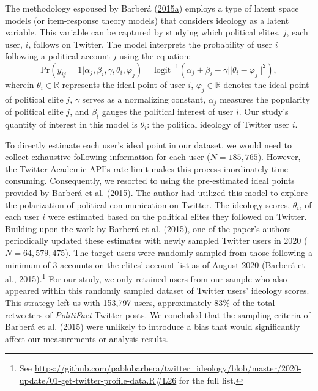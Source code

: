\documentclass[
  12pt,
]{article}
\begin{document}
The methodology espoused by Barberá
(\protect\hyperlink{ref-barbera2015birds}{2015a}) employs a type of
latent space models (or item-response theory models) that considers
ideology as a latent variable. This variable can be captured by studying
which political elites, \(j\), each user, \(i\), follows on Twitter. The
model interprets the probability of user \(i\) following a political
account \(j\) using the equation: \begin{equation}
\text{Pr}(y_{ij} = 1 |\alpha_j, \beta_i, \gamma, \theta_i, \varphi_j) = \text{logit}^{-1}\left(\alpha_j + \beta_i - \gamma||\theta_i - \varphi_j||^2\right),
\end{equation} wherein \(\theta_i \in \mathbb{R}\) represents the ideal
point of user \(i\), \(\varphi_j \in \mathbb{R}\) denotes the ideal
point of political elite \(j\), \(\gamma\) serves as a normalizing
constant, \(\alpha_j\) measures the popularity of political elite \(j\),
and \(\beta_i\) gauges the political interest of user \(i\). Our study's
quantity of interest in this model is \(\theta_i\): the political
ideology of Twitter user \(i\).

To directly estimate each user's ideal point in our dataset, we would
need to collect exhaustive following information for each user
(\(N = 185,765\)). However, the Twitter Academic API's rate limit makes
this process inordinately time-consuming. Consequently, we resorted to
using the pre-estimated ideal points provided by Barberá et al.
(\protect\hyperlink{ref-barbera2015tweeting}{2015}). The author had
utilized this model to explore the polarization of political
communication on Twitter. The ideology scores, \(\theta_i\), of each
user \(i\) were estimated based on the political elites they followed on
Twitter. Building upon the work by Barberá et al.
(\protect\hyperlink{ref-barbera2015tweeting}{2015}), one of the paper's
authors periodically updated these estimates with newly sampled Twitter
users in 2020 (\(N = 64,579,475\)). The target users were randomly
sampled from those following a minimum of 3 accounts on the elites'
account list as of August 2020
(\protect\hyperlink{ref-barbera2015tweeting}{Barberá et al.,
2015}).\footnote{See
  \url{https://github.com/pablobarbera/twitter_ideology/blob/master/2020-update/01-get-twitter-profile-data.R\#L26}
  for the full list.} For our study, we only retained users from our
sample who also appeared within this randomly sampled dataset of Twitter
users' ideology scores. This strategy left us with 153,797 users,
approximately 83\% of the total retweeters of \emph{PolitiFact} Twitter
posts. We concluded that the sampling criteria of Barberá et al.
(\protect\hyperlink{ref-barbera2015tweeting}{2015}) were unlikely to
introduce a bias that would significantly affect our measurements or
analysis results.
\end{document}
